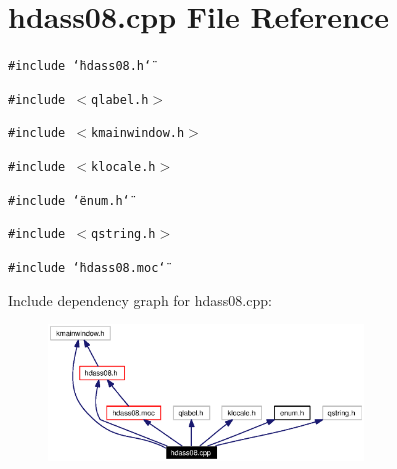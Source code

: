 \section{hdass08.cpp File Reference}
\label{hdass08_8cpp}


{\tt \#include \char`\"{}hdass08.h\char`\"{}}\par
{\tt \#include $<$qlabel.h$>$}\par
{\tt \#include $<$kmainwindow.h$>$}\par
{\tt \#include $<$klocale.h$>$}\par
{\tt \#include \char`\"{}enum.h\char`\"{}}\par
{\tt \#include $<$qstring.h$>$}\par
{\tt \#include \char`\"{}hdass08.moc\char`\"{}}\par


Include dependency graph for hdass08.cpp:\begin{figure}[H]
\begin{center}
\leavevmode
\includegraphics[width=237pt]{hdass08_8cpp__incl}
\end{center}
\end{figure}
